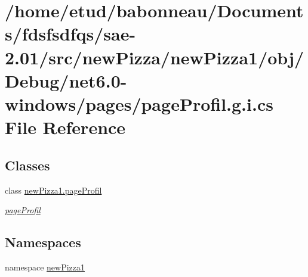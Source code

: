 \hypertarget{net6_80-windows_2pages_2pageProfil_8g_8i_8cs}{}\section{/home/etud/babonneau/\+Documents/fdsfsdfqs/sae-\/2.01/src/new\+Pizza/new\+Pizza1/obj/\+Debug/net6.0-\/windows/pages/page\+Profil.g.\+i.\+cs File Reference}
\label{net6_80-windows_2pages_2pageProfil_8g_8i_8cs}
\subsection*{Classes}
\begin{DoxyCompactItemize}
\item 
class \hyperlink{classnewPizza1_1_1pageProfil}{new\+Pizza1.\+page\+Profil}
\begin{DoxyCompactList}\small\item\em \hyperlink{classnewPizza1_1_1pageProfil}{page\+Profil} \end{DoxyCompactList}\end{DoxyCompactItemize}
\subsection*{Namespaces}
\begin{DoxyCompactItemize}
\item 
namespace \hyperlink{namespacenewPizza1}{new\+Pizza1}
\end{DoxyCompactItemize}
